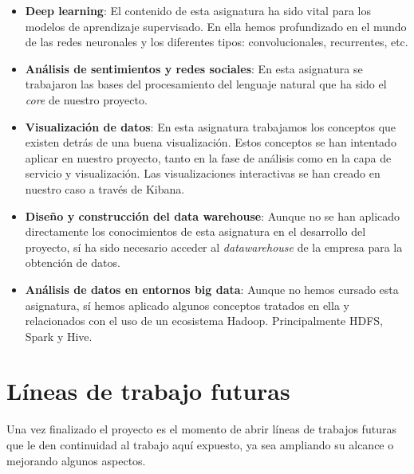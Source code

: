 \begin{itemize}
\item  \textbf{Deep learning}: El contenido de esta asignatura ha sido vital para los modelos de aprendizaje supervisado. En ella hemos profundizado en el mundo de las redes neuronales y los diferentes tipos: convolucionales, recurrentes, etc.

\item  \textbf{Análisis de sentimientos y redes sociales}: En esta asignatura se trabajaron las bases del procesamiento del lenguaje natural que ha sido el \textit{core} de nuestro proyecto.

\item  \textbf{Visualización de datos}: En esta asignatura trabajamos los conceptos que existen detrás de una buena visualización. Estos conceptos se han intentado aplicar en nuestro proyecto, tanto en la fase de análisis como en la capa de servicio y visualización. Las visualizaciones interactivas se han creado en nuestro caso a través de Kibana.

\item  \textbf{Diseño y construcción del data warehouse}: Aunque no se han aplicado directamente los conocimientos de esta asignatura en el desarrollo del proyecto, sí ha sido necesario acceder al \textit{datawarehouse} de la empresa para la obtención de datos.


\item \textbf{Análisis de datos en entornos big data}: Aunque no hemos cursado esta asignatura, sí hemos aplicado algunos conceptos tratados en ella y relacionados con el uso de un ecosistema Hadoop. Principalmente HDFS, Spark y Hive.


\end{itemize}





\section{Líneas de trabajo futuras}
\label{section:con:fut}

Una vez finalizado el proyecto es el momento de abrir líneas de trabajos futuras que le den continuidad al trabajo aquí expuesto, ya sea ampliando su alcance o mejorando algunos aspectos.




